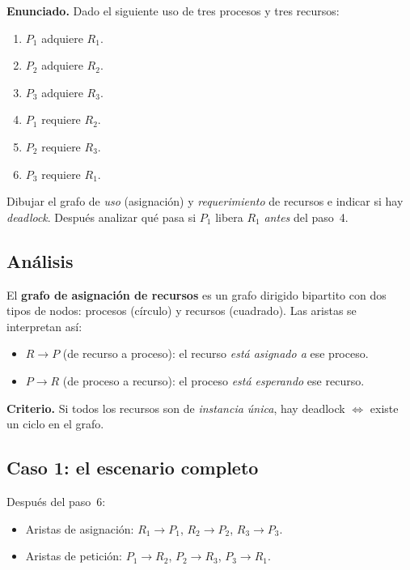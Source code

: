 \documentclass[11pt,a4paper]{article}
\begin{document}
\textbf{Enunciado.} Dado el siguiente uso de tres procesos y tres
recursos:

\begin{enumerate}[leftmargin=*,nosep,label=\arabic*.]
    \item $P_1$ adquiere $R_1$.
    \item $P_2$ adquiere $R_2$.
    \item $P_3$ adquiere $R_3$.
    \item $P_1$ requiere $R_2$.
    \item $P_2$ requiere $R_3$.
    \item $P_3$ requiere $R_1$.
\end{enumerate}

Dibujar el grafo de \emph{uso} (asignación) y \emph{requerimiento} de
recursos e indicar si hay \emph{deadlock}. Después analizar qué pasa
si $P_1$ libera $R_1$ \emph{antes} del paso~4.

\subsection*{Análisis}

El \textbf{grafo de asignación de recursos} es un grafo dirigido
bipartito con dos tipos de nodos: procesos (círculo) y recursos
(cuadrado). Las aristas se interpretan así:

\begin{itemize}[leftmargin=*,nosep]
    \item $R \to P$ (de recurso a proceso): el recurso \emph{está
        asignado a} ese proceso.
    \item $P \to R$ (de proceso a recurso): el proceso \emph{está
        esperando} ese recurso.
\end{itemize}

\textbf{Criterio.} Si todos los recursos son de \emph{instancia
única}, hay deadlock $\Longleftrightarrow$ existe un ciclo en el
grafo.

\subsection*{Caso 1: el escenario completo}

Después del paso~6:

\begin{itemize}[leftmargin=*,nosep]
    \item Aristas de asignación: $R_1 \to P_1$, $R_2 \to P_2$, $R_3 \to P_3$.
    \item Aristas de petición: $P_1 \to R_2$, $P_2 \to R_3$, $P_3 \to R_1$.
\end{itemize}
\end{document}
